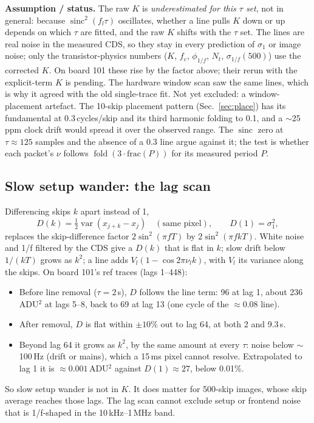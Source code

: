 \documentclass[10pt,a4paper]{article}
\newcommand{\sinc}{\operatorname{sinc}}
\newcommand{\caveat}[1]{\par\smallskip\noindent\colorbox{orange!10}{\parbox{\dimexpr\linewidth-2\fboxsep}{\small\textbf{Assumption / status.} #1}}\par\smallskip}
\begin{document}
\caveat{The raw $K$ is \emph{underestimated for this $\tau$ set}, not in general: because $\sinc^2(f_l\tau)$
oscillates, whether a line pulls $K$ down or up depends on which $\tau$ are fitted, and the raw $K$ shifts with the
$\tau$ set. The lines are real noise in the measured CDS, so they stay in every prediction of $\sigma_1$ or image noise;
only the transistor-physics numbers ($K$, $f_c$, $\phi_{1/f}$, $N_t$, $\sigma_{1/f}(500)$) use the corrected $K$. On
board 101 these rise by the factor above; their rerun with the explicit-term $K$ is pending. The hardware window scan
saw the same lines, which is why it agreed with the old single-trace fit. Not yet excluded: a window-placement artefact.
The 10-skip placement pattern (Sec.~\ref{sec:place}) has its fundamental at 0.3\,cycles/skip and its third harmonic
folding to 0.1, and a $\sim$25\,ppm clock drift would spread it over the observed range. The $\sinc$ zero at
$\tau\approx125$ samples and the absence of a 0.3 line argue against it; the test is whether each packet's $\nu$
follows $\operatorname{fold}(3\cdot\mathrm{frac}(P))$ for its measured period $P$.}

\subsection{Slow setup wander: the lag scan}
Differencing skips $k$ apart instead of 1,
\begin{equation}
D(k)=\tfrac12\operatorname{var}(x_{j+k}-x_j)\quad(\text{same pixel}),\qquad D(1)=\sigma_1^2,
\end{equation}
replaces the skip-difference factor $2\sin^2(\pi fT)$ by $2\sin^2(\pi fkT)$. White noise and 1/f filtered by the CDS
give a $D(k)$ that is flat in $k$; slow drift below $1/(kT)$ grows as $k^2$; a line adds $V_l(1-\cos2\pi\nu_lk)$, with
$V_l$ its variance along the skips. On board 101's ref traces (lags 1--448):
\begin{itemize}
\item Before line removal ($\tau=2$\,\textmu s), $D$ follows the line term: 96 at lag 1, about 236\,ADU$^2$ at lags 5--8,
back to 69 at lag 13 (one cycle of the $\approx$0.08 line).
\item After removal, $D$ is flat within $\pm10\%$ out to lag 64, at both 2 and 9.3\,\textmu s.
\item Beyond lag 64 it grows as $k^2$, by the same amount at every $\tau$: noise below $\sim$100\,Hz (drift or mains),
which a 15\,ms pixel cannot resolve. Extrapolated to lag 1 it is $\approx0.001$\,ADU$^2$ against $D(1)\approx27$,
below 0.01\%.
\end{itemize}
So slow setup wander is not in $K$. It does matter for 500-skip images, whose skip average reaches those lags. The
lag scan cannot exclude setup or frontend noise that is 1/f-shaped in the 10\,kHz--1\,MHz band.
\end{document}
